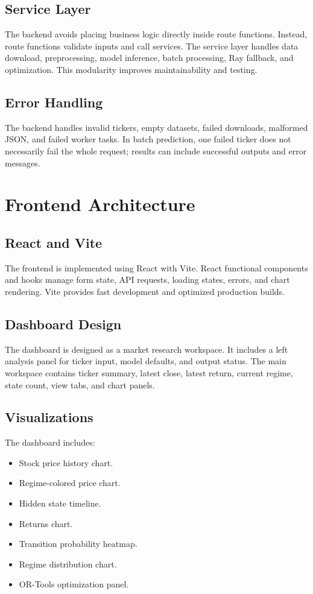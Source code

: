 \documentclass[12pt,a4paper]{report}
\begin{document}
\section{Service Layer}
The backend avoids placing business logic directly inside route functions. Instead, route functions validate inputs and call services. The service layer handles data download, preprocessing, model inference, batch processing, Ray fallback, and optimization. This modularity improves maintainability and testing.

\section{Error Handling}
The backend handles invalid tickers, empty datasets, failed downloads, malformed JSON, and failed worker tasks. In batch prediction, one failed ticker does not necessarily fail the whole request; results can include successful outputs and error messages.

\chapter{Frontend Architecture}
\section{React and Vite}
The frontend is implemented using React with Vite. React functional components and hooks manage form state, API requests, loading states, errors, and chart rendering. Vite provides fast development and optimized production builds.

\section{Dashboard Design}
The dashboard is designed as a market research workspace. It includes a left analysis panel for ticker input, model defaults, and output status. The main workspace contains ticker summary, latest close, latest return, current regime, state count, view tabs, and chart panels.

\section{Visualizations}
The dashboard includes:
\begin{itemize}
    \item Stock price history chart.
    \item Regime-colored price chart.
    \item Hidden state timeline.
    \item Returns chart.
    \item Transition probability heatmap.
    \item Regime distribution chart.
    \item OR-Tools optimization panel.
\end{itemize}
\end{document}
